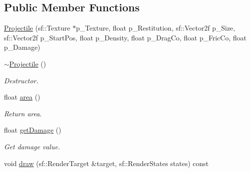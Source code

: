\subsection*{Public Member Functions}
\begin{DoxyCompactItemize}
\item 
\hyperlink{class_projectile_a5ed941ee600a7455a2c91fbacec4857e}{Projectile} (sf\+::\+Texture $\ast$p\+\_\+\+Texture, float p\+\_\+\+Restitution, sf\+::\+Vector2f p\+\_\+\+Size, sf\+::\+Vector2f p\+\_\+\+Start\+Pos, float p\+\_\+\+Density, float p\+\_\+\+Drag\+Co, float p\+\_\+\+Fric\+Co, float p\+\_\+\+Damage)
\item 
\mbox{\label{class_projectile_a94903e021fa2edab60ba3836ca0b937d}} 
\hyperlink{class_projectile_a94903e021fa2edab60ba3836ca0b937d}{$\sim$\+Projectile} ()
\begin{DoxyCompactList}\small\item\em Destructor. \end{DoxyCompactList}\item 
\mbox{\label{class_projectile_a69b205e012801b3b7b146790ededd8d6}} 
float \hyperlink{class_projectile_a69b205e012801b3b7b146790ededd8d6}{area} ()
\begin{DoxyCompactList}\small\item\em Return area. \end{DoxyCompactList}\item 
\mbox{\label{class_projectile_aad46fba4622a73c53b933486e60bf841}} 
float \hyperlink{class_projectile_aad46fba4622a73c53b933486e60bf841}{get\+Damage} ()
\begin{DoxyCompactList}\small\item\em Get damage value. \end{DoxyCompactList}\item 
void \hyperlink{class_projectile_ac61792f1670310d35ecec906ab5ada9d}{draw} (sf\+::\+Render\+Target \&target, sf\+::\+Render\+States states) const
\end{DoxyCompactItemize}
